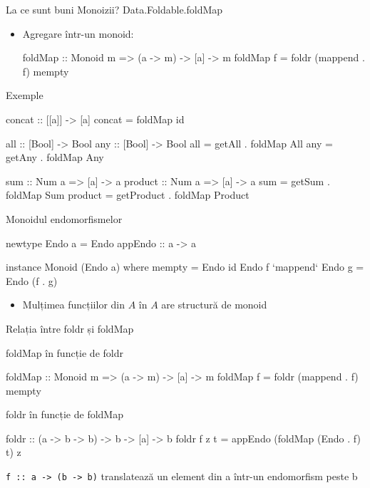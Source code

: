 \documentclass[xcolor=pdftex,romanian,colorlinks]{beamer}
\begin{document}
\begin{frame}[fragile]{La ce sunt buni Monoizii?}
{Data.Foldable.foldMap}
\begin{itemize}
\item Agregare într-un monoid:
\begin{asciihs}
    foldMap :: Monoid m => (a -> m) -> [a] -> m
    foldMap f = foldr (mappend . f) mempty
\end{asciihs}  
\end{itemize}
\begin{block}{Exemple}
\vspace{-2ex}
\begin{asciihs}
concat :: [[a]] -> [a]
concat = foldMap id
    
all :: [Bool] -> Bool         any :: [Bool] -> Bool
all = getAll . foldMap All    any = getAny . foldMap Any
    
sum :: Num a => [a] -> a      product :: Num a => [a] -> a
sum = getSum . foldMap Sum    product =
                                getProduct . foldMap Product
\end{asciihs}      
\end{block}
\end{frame}


\begin{frame}[fragile]{Monoidul endomorfismelor}
\begin{asciihs}
newtype Endo a = Endo { appEndo :: a -> a }

instance Monoid (Endo a) where
        mempty = Endo id
        Endo f `mappend` Endo g = Endo (f . g)
\end{asciihs}
\begin{itemize}
\item Mulțimea funcțiilor din $A$ în $A$ are structură de monoid
\end{itemize}
\end{frame}

\begin{frame}[fragile]{Relația între foldr și foldMap}
\begin{block}{foldMap în funcție de foldr}
\begin{asciihs}
    foldMap :: Monoid m => (a -> m) -> [a] -> m
    foldMap f = foldr (mappend . f) mempty
\end{asciihs}  
\end{block}

\begin{block}{foldr în funcție de foldMap}
\begin{asciihs}
    foldr :: (a -> b -> b) -> b -> [a] -> b
    foldr f z t = appEndo (foldMap (Endo . f) t) z
\end{asciihs}  

 \lstinline$f :: a -> (b -> b)$ translatează un element din a într-un endomorfism peste b
\end{block}
\end{frame}
\end{document}
